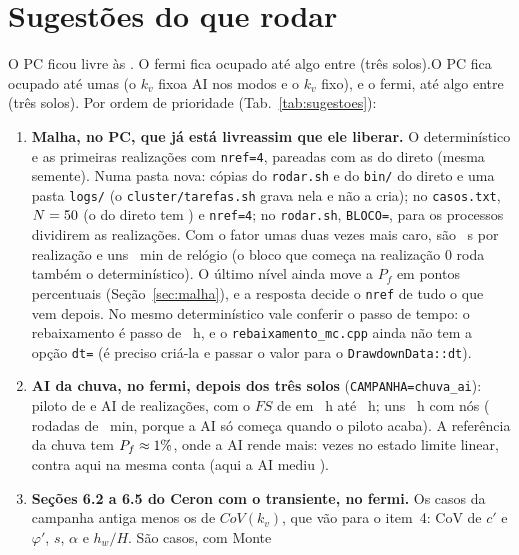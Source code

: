 \documentclass[11pt,a4paper]{article}
\begin{document}
\section{Sugestões do que rodar}\label{sec:sugestoes}
\ifkfixopronto O PC ficou livre às \FimKfixo. O fermi fica ocupado até algo entre \SolosFimFaixa{} (três
solos).\else O PC fica ocupado até umas \FimKfixo{} (\ifmodospronto o $k_v$ fixo\else a AI nos modos e o $k_v$
fixo\fi), e o fermi, até algo entre \SolosFimFaixa{} (três solos).\fi{} Por ordem de prioridade
(Tab.~\ref{tab:sugestoes}):
\begin{enumerate}
\item \textbf{Malha, no PC, \ifkfixopronto que já está livre\else assim que ele liberar\fi.} O determinístico e as \SugMalhaN{} primeiras realizações com
\texttt{nref=4}, pareadas com as do direto (mesma semente). Numa pasta nova: cópias do \texttt{rodar.sh} e do
\texttt{bin/} do direto e uma pasta \texttt{logs/} (o \texttt{cluster/tarefas.sh} grava nela e não a cria); no
\texttt{casos.txt}, $N = 50$ (o do direto tem \NDireto) e \texttt{nref=4}; no \texttt{rodar.sh},
\texttt{BLOCO=\SugMalhaBloco}, para os \ProcPC{} processos dividirem as realizações. Com o fator umas duas vezes mais
caro, são \SugMalhaCusto~s por realização e uns \SugMalhaRelogio~min de relógio (o bloco que começa na realização 0
roda também o determinístico). O último nível ainda move a $P_f$ em pontos percentuais (Seção~\ref{sec:malha}), e a
resposta decide o \texttt{nref} de tudo o que vem depois. No mesmo determinístico vale conferir o passo de tempo: o
rebaixamento é \PassosTrans{} passo de \DtTrans~h, e o \texttt{rebaixamento\_mc.cpp} ainda não tem a opção
\texttt{dt=} (é preciso criá-la e passar o valor para o \texttt{DrawdownData::dt}).
\item \textbf{AI da chuva, no fermi, depois dos três solos} (\texttt{CAMPANHA=chuva\_ai}): piloto de \ChuvaAIPiloto{}
e AI de \ChuvaAIN{} realizações, com o $FS$ de \ChuvaAIPasso{} em \ChuvaAIPasso~h até \ChuvaAIFim~h; uns
\ChuvaAIRelogio~h com \Nos{} nós (\ChuvaAIRodadas{} rodadas de \ChuvaAIMin~min, porque a AI só começa quando o piloto
acaba). A referência da chuva tem $P_f \approx 1\%$, onde a AI rende mais: \GanhoLinearUm{} vezes no estado
limite linear, contra \GanhoLinear{} aqui na mesma conta (aqui a AI mediu \GanhoBanda).
\item \textbf{Seções 6.2 a 6.5 do Ceron com o transiente, no fermi.} Os casos da campanha antiga menos os de
$CoV(k_v)$, que vão para o item~4: CoV de $c'$ e $\varphi'$, $s$, $\alpha$ e $h_w/H$. São \SugCasos{} casos, com Monte

\end{enumerate}
\end{document}
